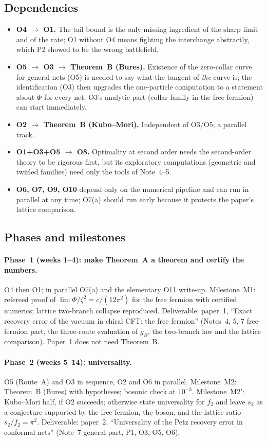 \documentclass[11pt]{article}
\theoremstyle{accent}
\theoremstyle{definition}
\begin{document}
\subsection{Dependencies}
\begin{itemize}[leftmargin=1.6em,itemsep=1pt]
\item \textbf{O4 \(\to\) O1.} The tail bound is the only missing ingredient of the sharp limit and of the rate; O1 without O4 means fighting the interchange abstractly, which P2 showed to be the wrong battlefield.
\item \textbf{O5 \(\to\) O3 \(\to\) Theorem~B (Bures).} Existence of the zero-collar curve for general nets (O5) is needed to say what the tangent of \emph{the} curve is; the identification (O3) then upgrades the one-particle computation to a statement about \(\Phi\) for every net.  O3's analytic part (collar family in the free fermion) can start immediately.
\item \textbf{O2 \(\to\) Theorem~B (Kubo--Mori).} Independent of O3/O5; a parallel track.
\item \textbf{O1+O3+O5 \(\to\) O8.} Optimality at second order needs the second-order theory to be rigorous first, but its exploratory computations (geometric and twirled families) need only the tools of Note~4--5.
\item \textbf{O6, O7, O9, O10} depend only on the numerical pipeline and can run in parallel at any time; O7(a) should run early because it protects the paper's lattice comparison.
\end{itemize}

\subsection{Phases and milestones}
\paragraph{Phase~1 (weeks 1--4): make Theorem~A a theorem and certify the numbers.}
O4 then O1; in parallel O7(a) and the elementary O11 write-up.  Milestone~M1: refereed proof of \(\lim\Phi/\zeta^2=c/(12\pi^2)\) for the free fermion with certified numerics; lattice two-branch collapse reproduced.  Deliverable: paper~1, ``Exact recovery error of the vacuum in chiral CFT: the free fermion'' (Notes~4, 5, 7 free-fermion part, the three-route evaluation of \(g_B\), the two-branch law and the lattice comparison).  Paper~1 does not need Theorem~B.

\paragraph{Phase~2 (weeks 5--14): universality.}
O5 (Route~A) and O3 in sequence, O2 and O6 in parallel.  Milestone~M2: Theorem~B (Bures) with hypotheses; bosonic check at \(10^{-3}\).  Milestone~M2': Kubo--Mori half, if O2 succeeds; otherwise state universality for \(f_2\) and leave \(s_2\) as a conjecture supported by the free fermion, the boson, and the lattice ratio \(s_2/f_2=\pi^2\).  Deliverable: paper~2, ``Universality of the Petz recovery error in conformal nets'' (Note~7 general part, P1, O3, O5, O6).
\end{document}
